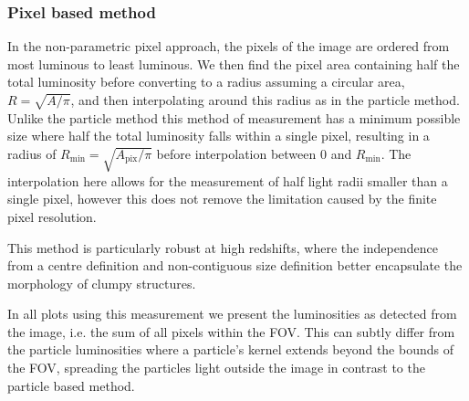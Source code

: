


\subsubsection{Pixel based method}
\label{sec:pixel}

In the non-parametric pixel approach, the pixels of the image are ordered from most luminous to least luminous. We then find the pixel area containing half the total luminosity before converting to a radius assuming a circular area, $R=\sqrt{A/\pi}$, and then interpolating around this radius as in the particle method. Unlike the particle method this method of measurement has a minimum possible size where half the total luminosity falls within a single pixel, resulting in a radius of $R_{\mathrm{min}}=\sqrt{A_{\mathrm{pix}}/\pi}$ before interpolation between 0 and $R_{\mathrm{min}}$. The interpolation here allows for the measurement of half light radii smaller than a single pixel, however this does not remove the limitation caused by the finite pixel resolution.

This method is particularly robust at high redshifts, where the independence from a centre definition and non-contiguous size definition better encapsulate the morphology of clumpy structures.

In all plots using this measurement we present the luminosities as detected from the image, i.e. the sum of all pixels within the FOV. This can subtly differ from the particle luminosities where a particle's kernel extends beyond the bounds of the FOV, spreading the particles light outside the image in contrast to the particle based method.

